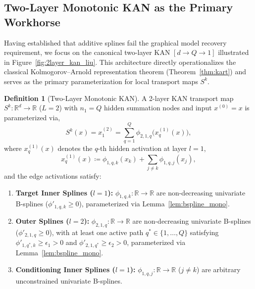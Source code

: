 \documentclass[11pt,a4paper]{article}
\theoremstyle{plain}
\theoremstyle{definition}
\newtheorem{definition}[theorem]{Definition}
\theoremstyle{remark}
\begin{document}
\subsection{Two-Layer Monotonic KAN as the Primary Workhorse}
\label{subsec:two_layer_kan}

Having established that additive splines fail the graphical model recovery requirement, we focus on the canonical two-layer KAN $[d \to Q \to 1]$ illustrated in Figure~\ref{fig:2layer_kan_liu}. This architecture directly operationalizes the classical Kolmogorov--Arnold representation theorem (Theorem~\ref{thm:kart}) and serves as the primary parameterization for local transport maps $S^k$.

\begin{definition}[Two-Layer Monotonic KAN]
\label{def:kan_2layer}
A 2-layer KAN transport map $S^k: \mathbb{R}^d \to \mathbb{R}$ ($L=2$) with $n_1 = Q$ hidden summation nodes and input $x^{(0)} = x$ is parameterized via,
\begin{equation}
    S^k(x) = x^{(2)}_1 = \sum_{q=1}^Q \phi_{2, 1, q}\big( x^{(1)}_q(x) \big),
    \label{eq:kan_2layer}
\end{equation}
where $x^{(1)}_q(x)$ denotes the $q$-th hidden activation at layer $l=1$,
\begin{equation}
    x^{(1)}_q(x) \coloneqq \phi_{1, q, k}(x_k) + \sum_{j \neq k} \phi_{1, q, j}(x_j),
    \label{eq:hidden_activation_uq}
\end{equation}
and the edge activations satisfy:
\begin{enumerate}
    \item \textbf{Target Inner Splines ($l=1$):} $\phi_{1, q, k}: \mathbb{R} \to \mathbb{R}$ are non-decreasing univariate B-splines ($\phi'_{1, q, k} \ge 0$), parameterized via Lemma~\ref{lem:bspline_mono}.
    \item \textbf{Outer Splines ($l=2$):} $\phi_{2, 1, q}: \mathbb{R} \to \mathbb{R}$ are non-decreasing univariate B-splines ($\phi'_{2, 1, q} \ge 0$), with at least one active path $q^* \in \{1, \dots, Q\}$ satisfying $\phi'_{1, q^*, k} \ge \epsilon_1 > 0$ and $\phi'_{2, 1, q^*} \ge \epsilon_2 > 0$, parameterized via Lemma~\ref{lem:bspline_mono}.
    \item \textbf{Conditioning Inner Splines ($l=1$):} $\phi_{1, q, j}: \mathbb{R} \to \mathbb{R}$ ($j \neq k$) are arbitrary unconstrained univariate B-splines.
\end{enumerate}
\end{definition}
\end{document}
